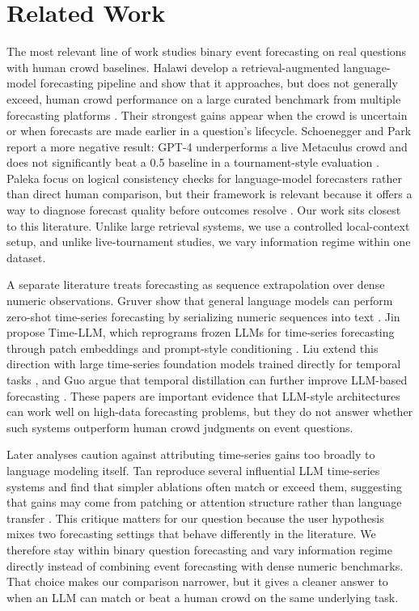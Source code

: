 \section{Related Work}
\label{sec:related}

 The most relevant line of work studies binary event forecasting on real questions with human crowd baselines. Halawi \etal develop a retrieval-augmented language-model forecasting pipeline and show that it approaches, but does not generally exceed, human crowd performance on a large curated benchmark from multiple forecasting platforms \cite{halawi2024approaching}. Their strongest gains appear when the crowd is uncertain or when forecasts are made earlier in a question's lifecycle. Schoenegger and Park report a more negative result: GPT-4 underperforms a live Metaculus crowd and does not significantly beat a 0.5 baseline in a tournament-style evaluation \cite{schoenegger2023llm}. Paleka \etal focus on logical consistency checks for language-model forecasters rather than direct human comparison, but their framework is relevant because it offers a way to diagnose forecast quality before outcomes resolve \cite{paleka2024consistency}. Our work sits closest to this literature. Unlike large retrieval systems, we use a controlled local-context setup, and unlike live-tournament studies, we vary information regime within one dataset.

 A separate literature treats forecasting as sequence extrapolation over dense numeric observations. Gruver \etal show that general language models can perform zero-shot time-series forecasting by serializing numeric sequences into text \cite{gruver2023llmtime}. Jin \etal propose Time-LLM, which reprograms frozen LLMs for time-series forecasting through patch embeddings and prompt-style conditioning \cite{jin2024timellm}. Liu \etal extend this direction with large time-series foundation models trained directly for temporal tasks \cite{liu2024timer}, and Guo \etal argue that temporal distillation can further improve LLM-based forecasting \cite{guo2026tllm}. These papers are important evidence that LLM-style architectures can work well on high-data forecasting problems, but they do not answer whether such systems outperform human crowd judgments on event questions.

 Later analyses caution against attributing time-series gains too broadly to language modeling itself. Tan \etal reproduce several influential LLM time-series systems and find that simpler ablations often match or exceed them, suggesting that gains may come from patching or attention structure rather than language transfer \cite{tan2024timeseries}. This critique matters for our question because the user hypothesis mixes two forecasting settings that behave differently in the literature. We therefore stay within binary question forecasting and vary information regime directly instead of combining event forecasting with dense numeric benchmarks. That choice makes our comparison narrower, but it gives a cleaner answer to when an LLM can match or beat a human crowd on the same underlying task.

